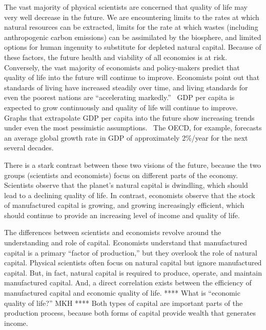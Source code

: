 
The vast majority of physical scientists are concerned that 
quality of life may very well decrease in the future. 
We are encountering 
limits to the rates at which natural resources can be extracted, 
limits for the rate at which wastes (including anthropogenic carbon emissions) 
can be assimilated by the biosphere, and
limited options for human ingenuity to substitute 
for depleted natural capital. 
Because of these factors, 
the future health and viability of all economies is at risk.\cite{IPCC2013} 
Conversely, the vast majority of economists and policy-makers predict 
that quality of life into the future will continue to improve. 
Economists point out that standards of living have increased steadily over time,
and living standards for even the poorest nations 
are ``accelerating markedly.''~\cite{Malik:2013aa} 
GDP per capita is expected to
grow continuously and quality of life will continue to improve. 
Graphs that extrapolate GDP per capita into the future show increasing
trends under even the most pessimistic assumptions.~\cite[p. 170]{Malik:2013aa} 
The OECD, for example, forecasts an average global
growth rate in GDP of approximately 2\%/year 
for the next several decades.\cite[Table A.1]{OECD2012}

There is a stark contrast between these two visions of the future, 
because the two groups (scientists and economists) focus on 
different parts of the economy.
Scientists observe that the planet's natural capital is dwindling, 
which should lead to a declining quality of life.
In contrast, economists observe that the stock of manufactured capital is growing, 
and growing increasingly efficient, which
should continue to provide an increasing level of income and quality of life. 

The differences between scientists and economists revolve around 
the understanding and role of capital.
Economists understand that manufactured capital is a primary ``factor of production,'' 
but they overlook the role of natural capital. 
Physical scientists often focus on natural capital but ignore manufactured capital. 
But, in fact, natural capital is required 
to produce, operate, and maintain manufactured capital. 
And, a direct correlation exists between the efficiency of manufactured capital
and economic quality of life. **** What is ``economic quality of life?'' MKH ****
Both types of capital are important parts of the production process, 
because both forms of capital provide wealth that generates income. 

